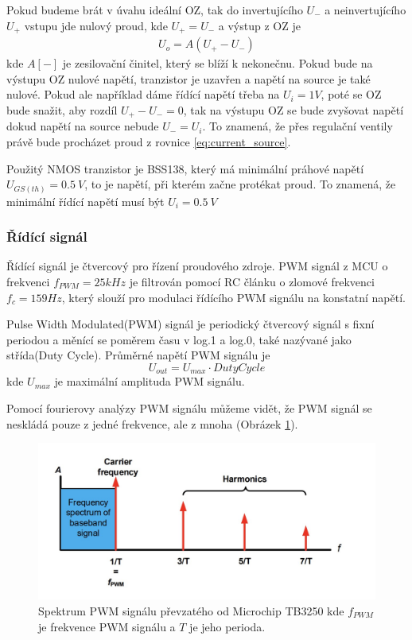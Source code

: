 Pokud budeme brát v úvahu ideální OZ, tak do invertujícího $U_-$ a neinvertujícího $U_+$ vstupu jde nulový proud, kde $U_+ = U_-$ a výstup z OZ je
\begin{align}
    U_o = A(U_+ - U_-)
\end{align}
kde $A [-] $ je zesilovační činitel, který se blíží k nekonečnu. Pokud bude na výstupu OZ nulové napětí, tranzistor je uzavřen a napětí na source je také nulové. Pokud ale například dáme řídící napětí třeba na $U_i = 1V$, poté se OZ bude snažit, aby rozdíl $U_+ - U_- = 0$, tak na výstupu OZ se bude zvyšovat napětí dokud napětí na source nebude $U_- = U_i$. To znamená, že přes regulační ventily právě bude procházet proud z rovnice \ref{eq:current_source}.

Použitý NMOS tranzistor je BSS138, který má minimální práhové napětí $U_{GS(th)} = 0.5 \ V$, to je napětí, při kterém začne protékat proud. To znamená, že minimální řídící napětí musí být $U_{i} = 0.5 \ V$


\subsubsection{Řídící signál}
Řídící signál je čtvercový pro řízení proudového zdroje. PWM signál z MCU o frekvenci $f_{PWM} = 25 kHz$ je filtrován pomocí RC článku o zlomové frekvenci $f_c = 159 Hz$, který slouží pro modulaci řídícího PWM signálu na konstatní napětí.
\par
Pulse Width Modulated(PWM) signál je periodický čtvercový signál s fixní periodou a měnící se poměrem času v log.1 a log.0, také nazývané jako střída(Duty Cycle). Průměrné napětí PWM signálu je
\begin{equation}
    U_{out} = U_{max} \cdot Duty Cycle
\end{equation}
kde $U_{max}$ je maximální amplituda PWM signálu. \par


Pomocí fourierovy analýzy PWM signálu můžeme vidět, že PWM signál se neskládá pouze z jedné frekvence, ale z mnoha (Obrázek \ref{fig:pwm_spectrum}).

\begin{figure}[H]
    \centering
    \includegraphics[width=1\linewidth]{pictures/pwm_spectrum_microchip90003250A.jpg}
    \caption{Spektrum PWM signálu převzatého od Microchip TB3250 kde $f_{PWM}$ je frekvence PWM signálu a $T$ je jeho perioda.}
    \label{fig:pwm_spectrum}
\end{figure}

